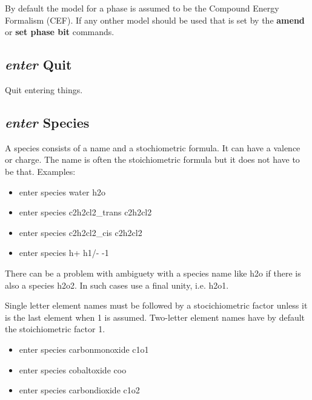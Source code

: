 \documentclass[12pt]{article}
\begin{document}
By default the model for a phase is assumed to be the Compound Energy
Formalism (CEF).  If any onther model should be used that is set by
the {\bf amend} or {\bf set phase bit} commands.

\subsection{{\em enter} Quit}

Quit entering things.

\subsection{{\em enter} Species}

A species consists of a name and a stochiometric formula.  It can have
a valence or charge.  The name is often the stoichiometric formula
but it does not have to be that.  Examples:

\begin{itemize}
\item enter species water h2o
\item enter species c2h2cl2\_trans c2h2cl2
\item enter species c2h2cl2\_cis c2h2cl2
\item enter species h+ h1/- -1
\end{itemize}

There can be a problem with ambiguety with a species name like h2o if
there is also a species h2o2.  In such cases use a final unity, i.e.
h2o1.

Single letter element names must be followed by a stocichiometric
factor unless it is the last element when 1 is assumed.  Two-letter
element names have by default the stoichiometric factor 1.

\begin{itemize}
\item enter species carbonmonoxide c1o1
\item enter species cobaltoxide coo
\item enter species carbondioxide c1o2
\end{itemize}
\end{document}
